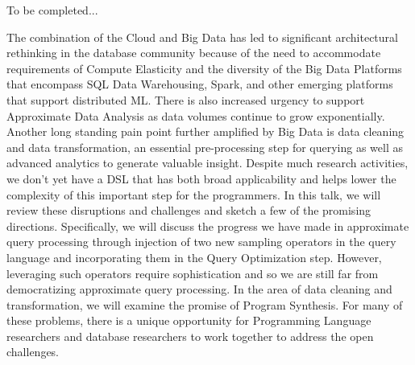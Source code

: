 \documentclass[a4paper,UKenglish]{dagrep-v2018}
\begin{document}
\license

To be completed...


\license

The combination of the Cloud and Big Data has led to significant architectural rethinking in the database community because of the need to accommodate requirements of Compute Elasticity and the diversity of the Big Data Platforms that encompass SQL Data Warehousing, Spark, and other emerging platforms that support distributed ML. There is also increased urgency to support Approximate Data Analysis as data volumes continue to grow exponentially. Another long standing pain point further amplified by Big Data is data cleaning and data transformation, an essential pre-processing step for querying as well as advanced analytics to generate valuable insight. Despite much research activities, we don’t yet have a DSL that has both broad applicability and helps lower the complexity of this important step for the programmers.  In this talk, we will review these disruptions and challenges and sketch a few of the promising directions. Specifically, we will discuss the progress we have made in approximate query processing through injection of two new sampling operators in the query language and incorporating them in the Query Optimization step.  However, leveraging such operators require sophistication and so we are still far from democratizing approximate query processing. In the area of data cleaning and transformation, we will examine the promise of Program Synthesis. For many of these problems, there is a unique opportunity for Programming Language researchers and database researchers to work together to address the open challenges.


\license
\end{document}
